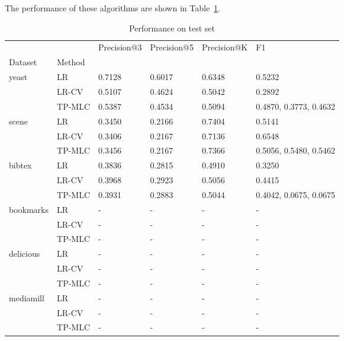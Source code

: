 \noindent
The performance of these algorithms are shown in Table~\ref{tab:perf}.

\begin{table}[!h]
\centering
\caption{Performance on test set}
\label{tab:perf}
\begin{tabular}{llllll}
\toprule
       &    & Precision@3 & Precision@5 & Precision@K &                      F1 \\
Dataset & Method &             &             &             &                         \\
\midrule
\multirow{3}{*}{yeast} & LR &      0.7128 &      0.6017 &      0.6348 &                  0.5232 \\
       & LR-CV &      0.5107 &      0.4624 &      0.5042 &                  0.2892 \\
       & TP-MLC &      0.5387 &      0.4534 &      0.5094 &  0.4870, 0.3773, 0.4632 \\
\cline{1-6}
\multirow{3}{*}{scene} & LR &      0.3450 &      0.2166 &      0.7404 &                  0.5141 \\
       & LR-CV &      0.3406 &      0.2167 &      0.7136 &                  0.6548 \\
       & TP-MLC &      0.3456 &      0.2167 &      0.7366 &  0.5056, 0.5480, 0.5462 \\
\cline{1-6}
\multirow{3}{*}{bibtex} & LR &      0.3836 &      0.2815 &      0.4910 &                  0.3250 \\
       & LR-CV &      0.3968 &      0.2923 &      0.5056 &                  0.4415 \\
       & TP-MLC &      0.3931 &      0.2883 &      0.5044 &  0.4042, 0.0675, 0.0675 \\
\cline{1-6}
\multirow{3}{*}{bookmarks} & LR &           - &           - &           - &                       - \\
       & LR-CV &           - &           - &           - &                       - \\
       & TP-MLC &           - &           - &           - &                       - \\
\cline{1-6}
\multirow{3}{*}{delicious} & LR &           - &           - &           - &                       - \\
       & LR-CV &           - &           - &           - &                       - \\
       & TP-MLC &           - &           - &           - &                       - \\
\cline{1-6}
\multirow{3}{*}{mediamill} & LR &           - &           - &           - &                       - \\
       & LR-CV &           - &           - &           - &                       - \\
       & TP-MLC &           - &           - &           - &                       - \\
\bottomrule
\end{tabular}

\end{table}



